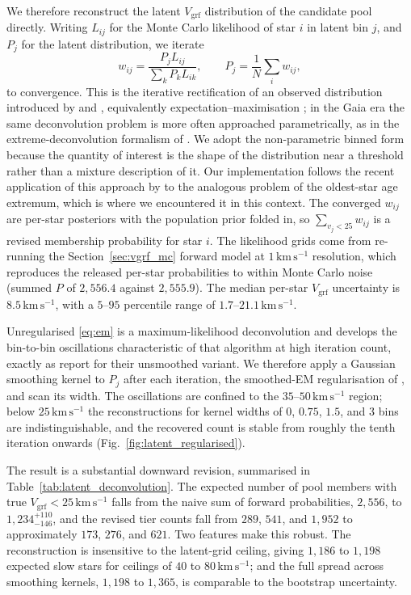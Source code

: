 \documentclass{aa}  %
\newcommand{\vgrf}{\ensuremath{V_{\mathrm{grf}}}\xspace}
\newcommand{\kms}{\ensuremath{\,\mathrm{km\,s^{-1}}}\xspace}
\begin{document}
We therefore reconstruct the latent \vgrf{} distribution of the candidate
pool directly.  Writing $L_{ij}$ for the Monte Carlo likelihood of star
$i$ in latent bin $j$, and $P_j$ for the latent distribution, we iterate
\begin{equation}
w_{ij} = \frac{P_j L_{ij}}{\sum_k P_k L_{ik}}, \qquad
P_j = \frac{1}{N}\sum_i w_{ij},
\label{eq:em}
\end{equation}
to convergence.  This is the iterative rectification of an observed
distribution introduced by \citet{Richardson1972} and \citet{Lucy1974},
equivalently expectation--maximisation
\citep{Dempster1977}; in the Gaia era the same
deconvolution problem is more often approached parametrically, as in the
extreme-deconvolution formalism of \citet{Bovy2011}.  We adopt the
non-parametric binned form because the quantity of interest is the shape
of the distribution near a threshold rather than a mixture description of
it.  Our implementation follows the recent application of this approach by
\citet{Banik2026} to the analogous problem of the oldest-star age
extremum, which is where we encountered it in this context.  The converged
$w_{ij}$ are per-star posteriors with the population prior folded in, so
$\sum_{v_j<25} w_{ij}$ is a revised membership probability
for star $i$.  The likelihood grids come from re-running the
Section~\ref{sec:vgrf_mc} forward model at $1\kms$ resolution, which
reproduces the released per-star probabilities to within Monte Carlo
noise (summed $P$ of $2{,}556.4$ against $2{,}555.9$).  The median
per-star \vgrf{} uncertainty is $8.5\kms$, with a $5$--$95$ percentile
range of $1.7$--$21.1\kms$.

Unregularised \eqref{eq:em} is a maximum-likelihood deconvolution and
develops the bin-to-bin oscillations characteristic of that algorithm at
high iteration count, exactly as \citet{Banik2026} report for their
unsmoothed variant.  We therefore apply a Gaussian smoothing kernel to
$P_j$ after each iteration, the smoothed-EM regularisation of
\citet{Silverman1990}, and scan its width.  The oscillations are confined to the $35$--$50\kms$ region;
below $25\kms$ the reconstructions for kernel widths of $0$, $0.75$,
$1.5$, and $3$ bins are indistinguishable, and the recovered count is
stable from roughly the tenth iteration onwards
(Fig.~\ref{fig:latent_regularised}).

The result is a substantial downward revision, summarised in
Table~\ref{tab:latent_deconvolution}.  The expected number of pool
members with true $\vgrf<25\kms$ falls from the naive sum of forward
probabilities, $2{,}556$, to $1{,}234^{+110}_{-146}$, and the revised
tier counts fall from $289$, $541$, and $1{,}952$ to approximately $173$,
$276$, and $621$.  Two features make this robust.  The reconstruction is
insensitive to the latent-grid ceiling, giving $1{,}186$ to $1{,}198$
expected slow stars for ceilings of $40$ to $80\kms$; and the full spread
across smoothing kernels, $1{,}198$ to $1{,}365$, is comparable to the
bootstrap uncertainty.
\end{document}
